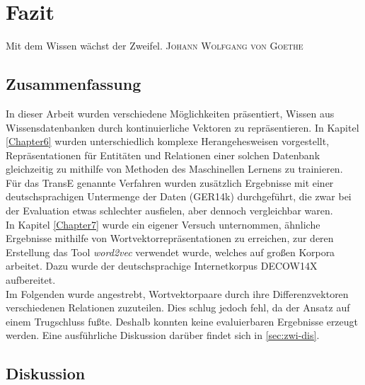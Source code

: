 
\chapter{Fazit} %

\label{Chapter9} %


\begin{itquote}
  Mit dem Wissen wächst der Zweifel.
  \flushright
  \textsc{Johann Wolfgang von Goethe}
\end{itquote}

\section{Zusammenfassung}

In dieser Arbeit wurden verschiedene Möglichkeiten präsentiert, Wissen aus Wissensdatenbanken durch kontinuierliche Vektoren
zu repräsentieren. In Kapitel \ref{Chapter6} wurden unterschiedlich komplexe Herangehesweisen vorgestellt, Repräsentationen
für Entitäten und Relationen einer solchen Datenbank gleichzeitig zu mithilfe von Methoden des Maschinellen Lernens zu trainieren.\\
Für das TransE genannte Verfahren wurden zusätzlich Ergebnisse mit einer deutschsprachigen Untermenge der Daten (GER14k)
durchgeführt, die zwar bei der Evaluation etwas schlechter ausfielen, aber dennoch vergleichbar waren.\\

In Kapitel \ref{Chapter7} wurde ein eigener Versuch unternommen, ähnliche Ergebnisse mithilfe von Wortvektorrepräsentationen
zu erreichen, zur deren Erstellung das Tool \emph{word2vec} verwendet wurde, welches auf großen Korpora arbeitet. Dazu
wurde der deutschsprachige Internetkorpus DECOW14X aufbereitet.\\
Im Folgenden wurde angestrebt, Wortvektorpaare durch ihre Differenzvektoren verschiedenen Relationen zuzuteilen. Dies schlug
jedoch fehl, da der Ansatz auf einem Trugschluss fußte. Deshalb konnten keine evaluierbaren Ergebnisse erzeugt werden.
Eine ausführliche Diskussion darüber findet sich in \ref{sec:zwi-dis}.

\section{Diskussion}

